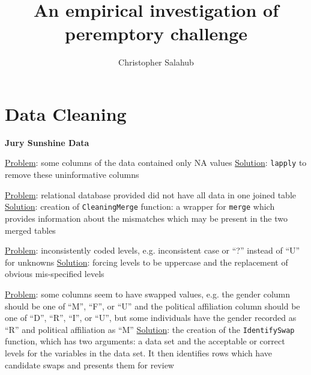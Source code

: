 \documentclass{article}
\title{An empirical investigation of peremptory challenge}
\author{Christopher Salahub}
\begin{document}

\maketitle

\section{Data Cleaning}

\textbf{Jury Sunshine Data}

\underline{Problem}: some columns of the data contained only NA values
\underline{Solution}: \texttt{lapply} to remove these uninformative columns

\underline{Problem}: relational database provided did not have all data in one joined table
\underline{Solution}: creation of \texttt{CleaningMerge} function: a wrapper for \texttt{merge} which provides information about the
mismatches which may be present in the two merged tables

\underline{Problem}: inconsistently coded levels, e.g. inconsistent case or ``?'' instead of ``U'' for unknowns
\underline{Solution}: forcing levels to be uppercase and the replacement of obvious mis-specified levels

\underline{Problem}: some columns seem to have swapped values, e.g. the gender column should be one of ``M'', ``F'', or ``U'' and the
political affiliation column should be one of ``D'', ``R'', ``I'', or ``U'', but some individuals have the gender recorded as
``R'' and political affiliation as ``M''
\underline{Solution}: the creation of the \texttt{IdentifySwap} function, which has two arguments: a data set and the acceptable or correct
levels for the variables in the data set. It then identifies rows which have candidate swaps and presents them for review
\end{document}
